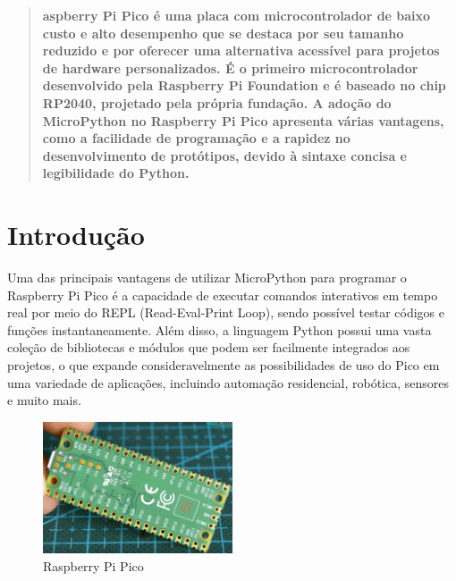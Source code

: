 \documentclass[a4paper,11pt]{article}
\begin{document}
\maketitle %
\thispagestyle{fancy} %


\begin{abstract}
\textbf{aspberry Pi Pico é uma placa com microcontrolador de baixo custo e alto desempenho que se destaca por seu tamanho reduzido e por oferecer uma alternativa acessível para projetos de hardware personalizados. É o primeiro microcontrolador desenvolvido pela Raspberry Pi Foundation e é baseado no chip RP2040, projetado pela própria fundação. A adoção do MicroPython no Raspberry Pi Pico apresenta várias vantagens, como a facilidade de programação e a rapidez no desenvolvimento de protótipos, devido à sintaxe concisa e legibilidade do Python.}
\end{abstract}

\section{Introdução}
Uma das principais vantagens de utilizar MicroPython para programar o Raspberry Pi Pico é a capacidade de executar comandos interativos em tempo real por meio do REPL (Read-Eval-Print Loop), sendo possível testar códigos e funções instantaneamente. Além disso, a linguagem Python possui uma vasta coleção de bibliotecas e módulos que podem ser facilmente integrados aos projetos, o que expande consideravelmente as possibilidades de uso do Pico em uma variedade de aplicações, incluindo automação residencial, robótica, sensores e muito mais.
\begin{figure}[H]
	\centering
	\includegraphics[width=0.5\textwidth]{imagem/PicoTraseira}
	\caption{Raspberry Pi Pico}
\end{figure}
\end{document}
